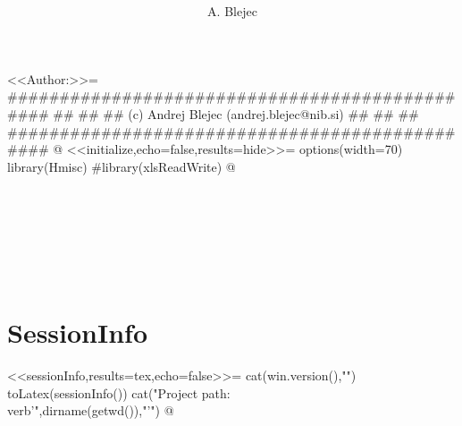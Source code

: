 \documentclass[a4paper,12pt]{article}
\begin{document}
\title{}
\author{A. Blejec}
%

\maketitle
\tableofcontents
<<Author:>>=
###############################################
##                                           ##
## (c) Andrej Blejec (andrej.blejec@nib.si)  ##
##                                           ##
###############################################
@
<<initialize,echo=false,results=hide>>=
options(width=70)
library(Hmisc)
#library(xlsReadWrite)
@

\section{}




%
%

%

\clearpage
\section*{SessionInfo}
{\small
<<sessionInfo,results=tex,echo=false>>=
cat(win.version(),"\n")
toLatex(sessionInfo())
cat("Project path:\\verb'",dirname(getwd()),"'\n")
@
}
\end{document}
